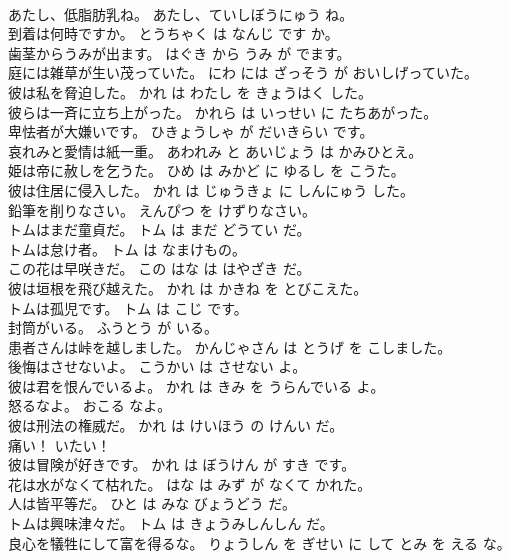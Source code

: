 \documentclass[8pt]{extreport}
\begin{document}
\begin{CJK}{UTF8}{min}
\\	あたし、低脂肪乳ね。	あたし、ていしぼうにゅう ね。	
\\	到着は何時ですか。	とうちゃく は なんじ です か。	
\\	歯茎からうみが出ます。	はぐき から うみ が でます。	
\\	庭には雑草が生い茂っていた。	にわ には ざっそう が おいしげっていた。	
\\	彼は私を脅迫した。	かれ は わたし を きょうはく した。	
\\	彼らは一斉に立ち上がった。	かれら は いっせい に たちあがった。	
\\	卑怯者が大嫌いです。	ひきょうしゃ が だいきらい です。	
\\	哀れみと愛情は紙一重。	あわれみ と あいじょう は かみひとえ。	
\\	姫は帝に赦しを乞うた。	ひめ は みかど に ゆるし を こうた。	
\\	彼は住居に侵入した。	かれ は じゅうきょ に しんにゅう した。	
\\	鉛筆を削りなさい。	えんぴつ を けずりなさい。	
\\	トムはまだ童貞だ。	トム は まだ どうてい だ。	
\\	トムは怠け者。	トム は なまけもの。	
\\	この花は早咲きだ。	この はな は はやざき だ。	
\\	彼は垣根を飛び越えた。	かれ は かきね を とびこえた。	
\\	トムは孤児です。	トム は こじ です。	
\\	封筒がいる。	ふうとう が いる。	
\\	患者さんは峠を越しました。	かんじゃさん は とうげ を こしました。	
\\	後悔はさせないよ。	こうかい は させない よ。	
\\	彼は君を恨んでいるよ。	かれ は きみ を うらんでいる よ。	
\\	怒るなよ。	おこる なよ。	
\\	彼は刑法の権威だ。	かれ は けいほう の けんい だ。	
\\	痛い！	いたい！	
\\	彼は冒険が好きです。	かれ は ぼうけん が すき です。	
\\	花は水がなくて枯れた。	はな は みず が なくて かれた。	
\\	人は皆平等だ。	ひと は みな びょうどう だ。	
\\	トムは興味津々だ。	トム は きょうみしんしん だ。	
\\	良心を犠牲にして富を得るな。	りょうしん を ぎせい に して とみ を える な。	

\end{CJK}
\end{document}
